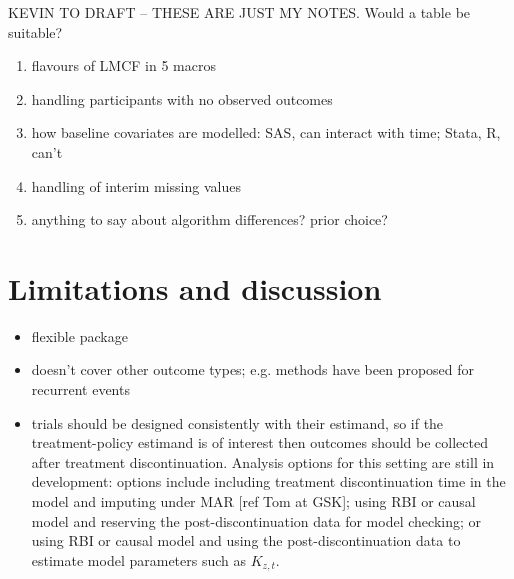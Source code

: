 KEVIN TO DRAFT -- THESE ARE JUST MY NOTES. Would a table be suitable?

\begin{enumerate}
\item flavours of LMCF in 5 macros
\item handling participants with no observed outcomes
\item how baseline covariates are modelled: SAS, can interact with time; Stata, R, can't
\item handling of interim missing values
\item anything to say about algorithm differences? prior choice?
\end{enumerate}


\section{Limitations and discussion}

\begin{itemize}
\item flexible package
\item doesn't cover other outcome types; e.g. methods have been proposed for recurrent events \citep{Keene++14}
\item trials should be designed consistently with their estimand, so if the treatment-policy estimand is of interest then outcomes should be collected after treatment discontinuation. Analysis options for this setting are still in development: options include including treatment discontinuation time in the model and imputing under MAR [ref Tom at GSK]; using RBI or causal model and reserving the post-discontinuation data for model checking; or using RBI or causal model and using the post-discontinuation data to estimate model parameters such as $K_{z,t}$. 
\end{itemize}

%
%


\address{Ian R White\\
MRC Clinical Trials Unit at UCL\\
90 High Holborn, 2nd Floor, London WC1V 6LJ\\
UK\\
ORCiD: 0000-0002-6718-7661\\
  }

\address{Kevin McGrath\\
MRC Clinical Trials Unit at UCL\\
90 High Holborn, 2nd Floor, London WC1V 6LJ\\
UK\\
  (ORCiD if desired)\\
  }

